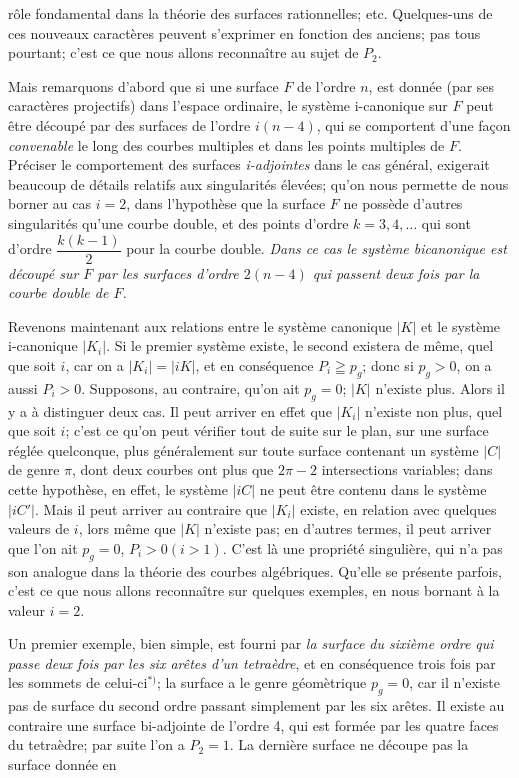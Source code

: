 \documentclass{article}
\begin{document}
rôle fondamental dans la théorie des surfaces rationnelles; etc. Quelques-uns de ces nouveaux caractères peuvent s'exprimer en fonction des anciens; pas tous pourtant; c'est ce que nous allons reconnaître au sujet de $P_{2}$.

Mais remarquons d'abord que si une surface $F$ de l'ordre $n$, est donnée (par ses caractères projectifs) dans l'espace ordinaire, le système i-canonique sur $F$ peut être découpé par des surfaces de l'ordre $i(n-4)$, qui se comportent d'une façon \emph{convenable} le long des courbes multiples et dans les points multiples de $F$. Préciser le comportement des surfaces \emph{i-adjointes} dans le cas général, exigerait beaucoup de détails relatifs aux singularités élevées; qu'on nous permette de nous borner au cas $i = 2$, dans l'hypothèse que la surface $F$ ne possède d'autres singularités qu'une courbe double, et des points d'ordre $k = 3, 4, \ldots$ qui sont d'ordre $\dfrac{k(k-1)}{2}$ pour la courbe double. \emph{Dans ce cas le système bicanonique est découpé sur $F$ par les surfaces d'ordre $2(n-4)$ qui passent deux fois par la courbe double de $F$.}

Revenons maintenant aux relations entre le système canonique $|K|$ et le système i-canonique $|K_{i}|$. Si le premier système existe, le second existera de même, quel que soit $i$, car on a $|K_{i}| = |iK|$, et en conséquence $P_{i} \geqq p_{g}$; donc si $p_{g} > 0$, on a aussi $P_{i} > 0$. Supposons, au contraire, qu'on ait $p_{g} = 0$; $|K|$ n'existe plus. Alors il y a à distinguer deux cas. Il peut arriver en effet que $|K_{i}|$ n'existe non plus, quel que soit $i$; c'est ce qu'on peut vérifier tout de suite sur le plan, sur une surface réglée quelconque, plus généralement sur toute surface contenant un système $|C|$ de genre $\pi$, dont deux courbes ont plus que $2\pi - 2$ intersections variables; dans cette hypothèse, en effet, le système $|iC|$ ne peut être contenu dans le système $|iC'|$. Mais il peut arriver au contraire que $|K_{i}|$ existe, en relation avec quelques valeurs de $i$, lors même que $|K|$ n'existe pas; en d'autres termes, il peut arriver que l'on ait $p_{g} = 0$, $P_{i} > 0 (i > 1)$. C'est là une propriété singulière, qui n'a pas son analogue dans la théorie des courbes algébriques. Qu'elle se présente parfois, c'est ce que nous allons reconnaître sur quelques exemples, en nous bornant à la valeur $i = 2$.

Un premier exemple, bien simple, est fourni par \emph{la surface du sixième ordre qui passe deux fois par les six arêtes d'un tetraèdre}, et en conséquence trois fois par les sommets de celui-ci${}^{*)}$; la surface a le genre géomètrique $p_{g} = 0$, car il n'existe pas de surface du second ordre passant simplement par les six arêtes. Il existe au contraire une surface bi-adjointe de l'ordre 4, qui est formée par les quatre faces du tetraèdre; par suite l'on a $P_{2} = 1$. La dernière surface ne découpe pas la surface donnée en
\end{document}

